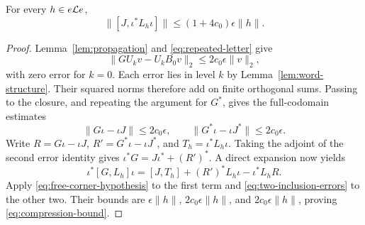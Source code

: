 \begin{lemma}
\label{lem:compressed-commutator}
For every $h\in e\mathcal L e$,
\begin{equation}
  \big\|[J,\iota^*L_h\iota]\big\|
       \le (1+4c_0)\epsilon\|h\|.
  \label{eq:compression-bound}
\end{equation}
\end{lemma}

\begin{proof}
Lemma~\ref{lem:propagation} and \eqref{eq:repeated-letter} give
\[
  \|GU_kv-U_kB_0v\|_2\le2c_0\epsilon\|v\|_2,
\]
with zero error for $k=0$. Each error lies in level $k$ by
Lemma~\ref{lem:word-structure}. Their squared norms therefore add on
finite orthogonal sums. Passing to the closure, and repeating the
argument for $G^*$, gives the full-codomain estimates
\begin{equation}
  \|G\iota-\iota J\|\le2c_0\epsilon,
  \qquad \|G^*\iota-\iota J^*\|\le2c_0\epsilon.
  \label{eq:two-inclusion-errors}
\end{equation}
Write $R=G\iota-\iota J$, $R'=G^*\iota-\iota J^*$, and
$T_h=\iota^*L_h\iota$. Taking the adjoint of the second error identity
gives $\iota^*G=J\iota^*+(R')^*$. A direct expansion now yields
\[
  \iota^*[G,L_h]\iota
     =[J,T_h]+(R')^*L_h\iota-\iota^*L_hR.
\]
Apply \eqref{eq:free-corner-hypothesis} to the first term and
\eqref{eq:two-inclusion-errors} to the other two. Their bounds are
$\epsilon\|h\|$, $2c_0\epsilon\|h\|$, and
$2c_0\epsilon\|h\|$, proving \eqref{eq:compression-bound}.
\end{proof}
